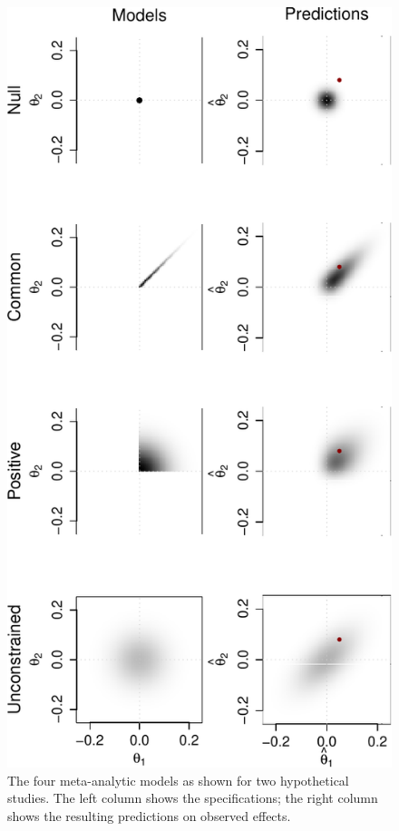 \documentclass[english,man]{apa6}
\theoremstyle{definition}
\theoremstyle{definition}
\theoremstyle{remark}
\begin{document}
\begin{figure}[htbp]
\centering
\includegraphics{pBlind_files/figure-latex/pred-1.pdf}
\caption{\label{fig:pred}The four meta-analytic models as shown for two
hypothetical studies. The left column shows the specifications; the
right column shows the resulting predictions on observed effects.}
\end{figure}
\end{document}

